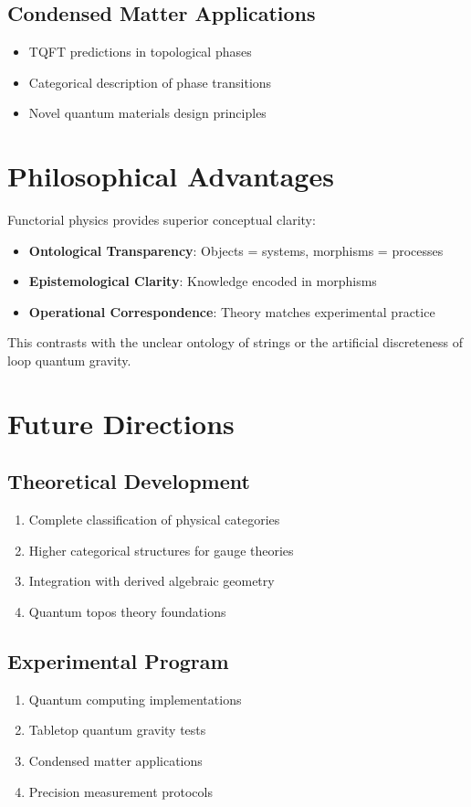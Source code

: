\documentclass[11pt,a4paper]{article}
\begin{document}
\subsection{Condensed Matter Applications}
\begin{itemize}
    \item TQFT predictions in topological phases
    \item Categorical description of phase transitions
    \item Novel quantum materials design principles
\end{itemize}

\section{Philosophical Advantages}

Functorial physics provides superior conceptual clarity:

\begin{itemize}
    \item \textbf{Ontological Transparency}: Objects = systems, morphisms = processes
    \item \textbf{Epistemological Clarity}: Knowledge encoded in morphisms
    \item \textbf{Operational Correspondence}: Theory matches experimental practice
\end{itemize}

This contrasts with the unclear ontology of strings or the artificial discreteness of loop quantum gravity.

\section{Future Directions}

\subsection{Theoretical Development}
\begin{enumerate}
    \item Complete classification of physical categories
    \item Higher categorical structures for gauge theories
    \item Integration with derived algebraic geometry
    \item Quantum topos theory foundations
\end{enumerate}

\subsection{Experimental Program}
\begin{enumerate}
    \item Quantum computing implementations
    \item Tabletop quantum gravity tests
    \item Condensed matter applications
    \item Precision measurement protocols
\end{enumerate}
\end{document}
